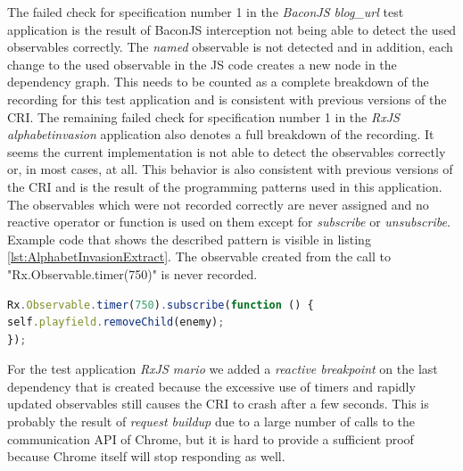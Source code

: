 The failed check for specification number 1 in the \emph{BaconJS blog\_url} test application is the result of BaconJS interception not being able to detect the used observables correctly. The \emph{named} observable is not detected and in addition, each change to the used observable in the JS code creates a new node in the dependency graph. This needs to be counted as a complete breakdown of the recording for this test application and is consistent with previous versions of the CRI. The remaining failed check for specification number 1 in the \emph{RxJS alphabetinvasion} application also denotes a full breakdown of the recording. It seems the current implementation is not able to detect the observables correctly or, in most cases, at all. This behavior is also consistent with previous versions of the CRI and is the result of the programming patterns used in this application. The observables which were not recorded correctly are never assigned and no reactive operator or function is used on them except for \emph{subscribe} or \emph{unsubscribe}. Example code that shows the described pattern is visible in listing \ref{lst:AlphabetInvasionExtract}. The observable created from the call to "Rx.Observable.timer(750)" is never recorded.

\begin{lstlisting}[language=JavaScript, caption={Extract of RxJS AlphabetInvasion test application.},label={lst:AlphabetInvasionExtract}]
Rx.Observable.timer(750).subscribe(function () {
self.playfield.removeChild(enemy);
});	
\end{lstlisting}

For the test application \emph{RxJS mario} we added a \emph{reactive breakpoint} on the last dependency that is created because the excessive use of timers and rapidly updated observables still causes the CRI to crash after a few seconds. This is probably the result of \emph{request buildup} due to a large number of calls to the communication API of Chrome, but it is hard to provide a sufficient proof because Chrome itself will stop responding as well.

